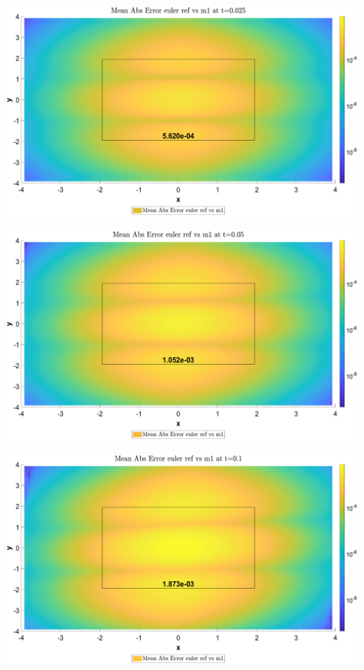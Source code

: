 \begin{landscape}
\includegraphics[width=.95\columnwidth]{CDF/CDFEulerRef_1}
\end{landscape}
\begin{landscape}
\includegraphics[width=.95\columnwidth]{CDF/CDFEulerRef_2}
\end{landscape}
\begin{landscape}
\includegraphics[width=.95\columnwidth]{CDF/CDFEulerRef_3}
\end{landscape}
